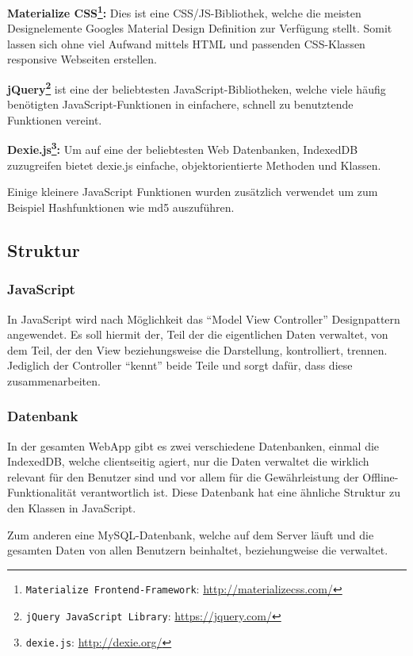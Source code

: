 \documentclass[a4paper,12pt,ngerman,listof=numbered]{scrartcl}      %
\let\oldcite\cite
\renewcommand{\cite}[1]{\textsuperscript{\oldcite{#1}}}
\newcommand{\spacer}{\par\bigskip\noindent}
\providecommand{\inlinecode}[1]{\texttt{#1}}
\begin{document}
	\spacer\textbf{Materialize CSS\footnote{\inlinecode{Materialize Frontend-Framework}: \url{http://materializecss.com/}}:} Dies ist eine CSS/JS-Bibliothek, welche die meisten Designelemente Googles Material Design Definition zur Verfügung stellt. Somit lassen sich ohne viel Aufwand mittels HTML und passenden CSS-Klassen responsive Webseiten erstellen.\par
	\spacer\textbf{jQuery\footnote{\inlinecode{jQuery JavaScript Library}: \url{https://jquery.com/}}} ist eine der beliebtesten JavaScript-Bibliotheken\cite{jQueryCoverage}, welche viele häufig be\-nö\-ti\-gten JavaScript-Funktionen in einfachere, schnell zu benutztende Funktionen vereint.\par
	\spacer\textbf{Dexie.js\footnote{\inlinecode{dexie.js}: \url{http://dexie.org/}}:} Um auf eine der beliebtesten Web Datenbanken, IndexedDB zuzugreifen bietet dexie.js einfache, objektorientierte Methoden und Klassen.\par
	\spacer Einige kleinere JavaScript Funktionen wurden zusätzlich verwendet um zum Beispiel Hashfunktionen wie md5 auszuführen.\par
	
	\subsection{Struktur}
	\subsubsection{JavaScript}
	In JavaScript wird nach Möglichkeit das ``Model View Controller''\cite{wikiMVC} Design\-pat\-tern angewendet. Es soll hiermit der, Teil der die eigentlichen Daten verwaltet, von dem Teil, der den View beziehungsweise die Darstellung, kontrolliert, trennen. Jediglich der Controller ``kennt'' beide Teile und sorgt dafür, dass diese zusammenarbeiten.\par
	
	\subsubsection{Datenbank}
	In der gesamten WebApp gibt es zwei verschiedene Datenbanken, einmal die IndexedDB, welche clientseitig agiert, nur die Daten verwaltet die wirklich relevant für den Benutzer sind und vor allem für die Gewährleistung der Offline-Funk\-ti\-o\-na\-li\-tät verantwortlich ist. Diese Datenbank hat eine ähnliche Struktur zu den Klassen in JavaScript.\par
	Zum anderen eine MySQL-Datenbank, welche auf dem Server läuft und die gesamten Daten von allen Benutzern beinhaltet, beziehungweise die verwaltet.\par
	
\end{document}
